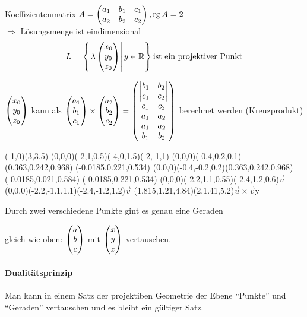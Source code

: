 Koeffizientenmatrix $A = \begin{pmatrix}
                          a_1 & b_1 & c_1 \\
                          a_2 & b_2 & c_2
                         \end{pmatrix}, \operatorname{rg} A = 2$\\
$\Rightarrow$ Lösungsmenge ist eindimensional
\[ L = \left\{\left.\lambda \begin{pmatrix}x_0\\y_0\\z_0\end{pmatrix} \right| y \in \mathbb{R}\right\} \text{ist ein projektiver Punkt}\]

$\begin{pmatrix}x_0\\y_0\\z_0\end{pmatrix}$ kann als $\begin{pmatrix}a_1\\b_1\\c_1\end{pmatrix} \times \begin{pmatrix}a_2\\b_2\\c_2\end{pmatrix} = \begin{pmatrix}
		\begin{vmatrix}
		 b_1 & b_2 \\
		 c_1 & c_2
		\end{vmatrix}\\
		\begin{vmatrix}
		 c_1 & c_2 \\
		 a_1 & a_2
		\end{vmatrix}\\
		\begin{vmatrix}
		 a_1 & a_2 \\
		 b_1 & b_2
		\end{vmatrix}\end{pmatrix}
$ berechnet werden (Kreuzprodukt)

\begin{center}
	\begin{pspicture}(-1,0)(3,3.5)
		\pstThreeDLine[fillstyle=hlines,hatchcolor=gray,linecolor=gray]{-}(0,0,0)(-2,1,0.5)(-4,0,1.5)(-2,-1,1)
		\pstThreeDSquare(0,0,0)(-0.4,0.2,0.1)(0.363,0.242,0.968)
		\pstThreeDDot[dotsize=1pt](-0.0185,0.221,0.534)
		\pstThreeDSquare(0,0,0)(-0.4,-0.2,0.2)(0.363,0.242,0.968)
		\pstThreeDDot[dotsize=1pt](-0.0185,0.021,0.584)
		\pstThreeDDot(-0.0185,0.221,0.534)
		\pstThreeDLine(0,0,0)(-2.2,1.1,0.55)\pstThreeDPut(-2.4,1.2,0.6){$\vec u$}
		\pstThreeDLine(0,0,0)(-2.2,-1.1,1.1)\pstThreeDPut(-2.4,-1.2,1.2){$\vec v$}
		\pstThreeDLine(1.815,1.21,4.84)\pstThreeDPut(2,1.41,5.2){$\vec u \times \vec v$}y
	\end{pspicture}
\end{center}


\Satz Durch zwei verschiedene Punkte gint es genau eine Geraden

\Bew gleich wie oben: $\begin{pmatrix}a\\b\\c\end{pmatrix}$ mit $\begin{pmatrix}x\\y\\z\end{pmatrix}$ vertauschen.

\paragraph*{Dualitätsprinzip} Man kann in einem Satz der projektiben Geometrie der Ebene "`Punkte"' und "`Geraden"'
	vertauschen und es bleibt ein gültiger Satz.
	

